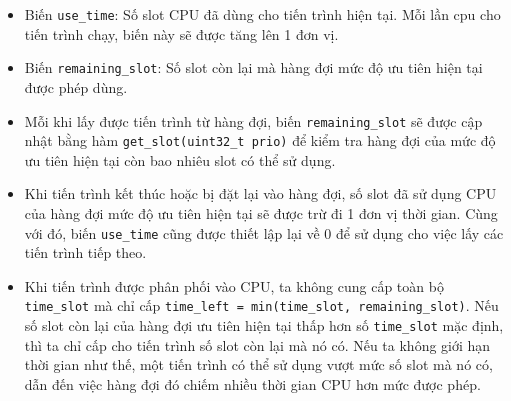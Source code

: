 \begin{itemize}
    \item Biến \texttt{use\_time}: Số slot CPU đã dùng cho tiến trình hiện tại. Mỗi lần cpu cho tiến trình chạy, biến này sẽ được tăng lên 1 đơn vị.
    \item Biến \texttt{remaining\_slot}: Số slot còn lại mà hàng đợi mức độ ưu tiên hiện tại được phép dùng.
    \item Mỗi khi lấy được tiến trình từ hàng đợi, biến \texttt{remaining\_slot} sẽ được cập nhật bằng hàm \texttt{get\_slot(uint32\_t prio)} để kiểm tra hàng đợi của mức độ ưu tiên hiện tại còn bao nhiêu slot có thể sử dụng.
    \item Khi tiến trình kết thúc hoặc bị đặt lại vào hàng đợi, số slot đã sử dụng CPU của hàng đợi mức độ ưu tiên hiện tại sẽ được trừ đi 1 đơn vị thời gian. Cùng với đó, biến \texttt{use\_time} cũng được thiết lập lại về 0 để sử dụng cho việc lấy các tiến trình tiếp theo.
    \item Khi tiến trình được phân phối vào CPU, ta không cung cấp toàn bộ \texttt{time\_slot} mà chỉ cấp \texttt{time\_left = min(time\_slot, remaining\_slot)}. Nếu số slot còn lại của hàng đợi ưu tiên hiện tại thấp hơn số \texttt{time\_slot} mặc định, thì ta chỉ cấp cho tiến trình số slot còn lại mà nó có. Nếu ta không giới hạn thời gian như thế, một tiến trình có thể sử dụng vượt mức số slot mà nó có, dẫn đến việc hàng đợi đó chiếm nhiều thời gian CPU hơn mức được phép.
\end{itemize}

